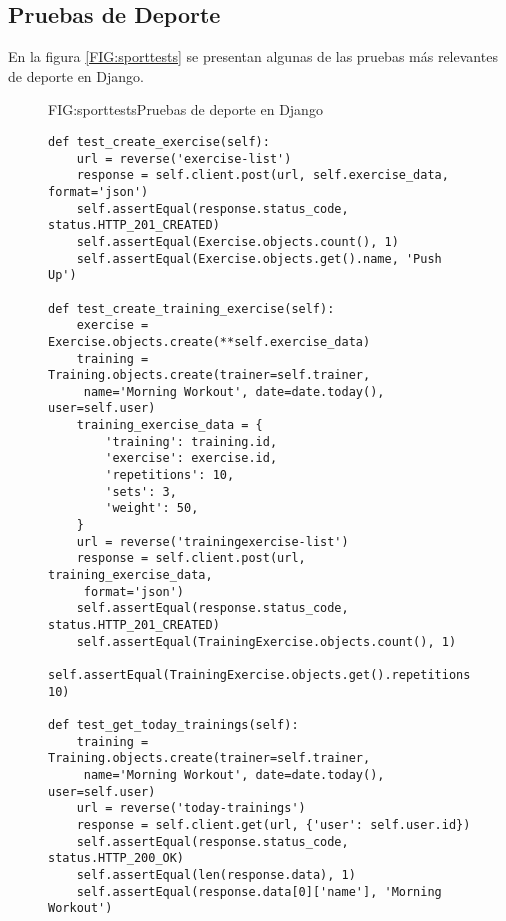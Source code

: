 \subsection{Pruebas de Deporte}
En la figura \ref{FIG:sporttests} se presentan algunas de las pruebas más relevantes de deporte en Django.
\begin{figure}[Pruebas de Deporte]{FIG:sporttests}{Pruebas de deporte en Django}
    \begin{verbatim}
def test_create_exercise(self):
    url = reverse('exercise-list')
    response = self.client.post(url, self.exercise_data, format='json')
    self.assertEqual(response.status_code, status.HTTP_201_CREATED)
    self.assertEqual(Exercise.objects.count(), 1)
    self.assertEqual(Exercise.objects.get().name, 'Push Up')

def test_create_training_exercise(self):
    exercise = Exercise.objects.create(**self.exercise_data)
    training = Training.objects.create(trainer=self.trainer,
     name='Morning Workout', date=date.today(), user=self.user)
    training_exercise_data = {
        'training': training.id,
        'exercise': exercise.id,
        'repetitions': 10,
        'sets': 3,
        'weight': 50,
    }
    url = reverse('trainingexercise-list')
    response = self.client.post(url, training_exercise_data,
     format='json')
    self.assertEqual(response.status_code, status.HTTP_201_CREATED)
    self.assertEqual(TrainingExercise.objects.count(), 1)
    self.assertEqual(TrainingExercise.objects.get().repetitions, 10)

def test_get_today_trainings(self):
    training = Training.objects.create(trainer=self.trainer,
     name='Morning Workout', date=date.today(), user=self.user)
    url = reverse('today-trainings')
    response = self.client.get(url, {'user': self.user.id})
    self.assertEqual(response.status_code, status.HTTP_200_OK)
    self.assertEqual(len(response.data), 1)
    self.assertEqual(response.data[0]['name'], 'Morning Workout')
    \end{verbatim}
    \end{figure}

\newpage

